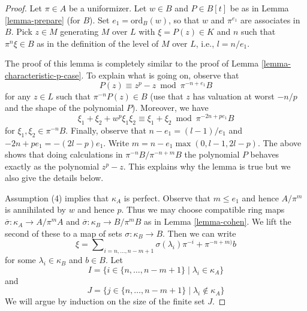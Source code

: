 \documentclass[10pt,a4paper]{amsart}
\theoremstyle{plain}
\theoremstyle{definition}
\theoremstyle{remark}
\numberwithin{equation}{subsection}
\begin{document}
\begin{proof}
Let $\pi \in A$ be a uniformizer.
Let $w \in B$ and $P \in B[t]$ be as in Lemma \ref{lemma-prepare} (for $B$).
Set $e_1 = \text{ord}_B(w)$, so that $w$ and $\pi^{e_1}$ are associates in $B$.
Pick $z \in M$ generating $M$ over $L$ with $\xi = P(z) \in K$
and $n$ such that $\pi^n\xi \in B$ as in the definition of the level
of $M$ over $L$, i.e., $l = n/e_1$.

\medskip\noindent
The proof of this lemma is completely similar to the proof of
Lemma \ref{lemma-characteristic-p-case}.
To explain what is going on, observe that
\begin{equation}
\label{equation-first-congruence}
P(z) \equiv z^p - z \bmod \pi^{-n + e_1}B
\end{equation}
for any $z \in L$ such that $\pi^{-n} P(z) \in B$ (use that $z$ has valuation
at worst $-n/p$ and the shape of the polynomial $P$). Moreover, we have
\begin{equation}
\label{equation-second-congruence}
\xi_1 + \xi_2 + w^p \xi_1 \xi_2 \equiv \xi_1 + \xi_2 \bmod \pi^{-2n + pe_1}B 
\end{equation}
for $\xi_1, \xi_2 \in \pi^{-n}B$. Finally, observe that
$n - e_1 = (l - 1)/e_1$ and $-2n + pe_1 = -(2l - p)e_1$.
Write $m = n - e_1 \max(0, l - 1, 2l - p)$. The above shows that doing
calculations in $\pi^{-n}B / \pi^{-n + m}B$ the polynomial $P$ behaves exactly
as the polynomial $z^p -  z$. This explains why the lemma is true
but we also give the details below.

\medskip\noindent
Assumption (4) implies that $\kappa_A$ is perfect. Observe that
$m \leq e_1$ and hence $A/\pi^m$ is annihilated by $w$ and hence $p$.
Thus we may choose compatible ring maps
$\overline{\sigma} : \kappa_A \to A/\pi^mA$ and
$\overline{\sigma} : \kappa_B \to B/\pi^mB$ as in
Lemma \ref{lemma-cohen}. We lift the second of these to a
map of sets $\sigma : \kappa_B \to B$. Then we can write
$$
\xi =
\sum\nolimits_{i = n, \ldots, n - m + 1} \sigma(\lambda_i) \pi^{-i} +
\pi^{-n + m)} b
$$
for some $\lambda_i \in \kappa_B$ and $b \in B$. Let
$$
I = \{i \in \{n, \ldots, n - m + 1\} \mid \lambda_i \in \kappa_A\}
$$
and
$$
J = \{j \in \{n, \ldots, n - m + 1\} \mid \lambda_i \not \in \kappa_A\}
$$
We will argue by induction on the size of the finite set $J$.


\end{proof}
\end{document}
